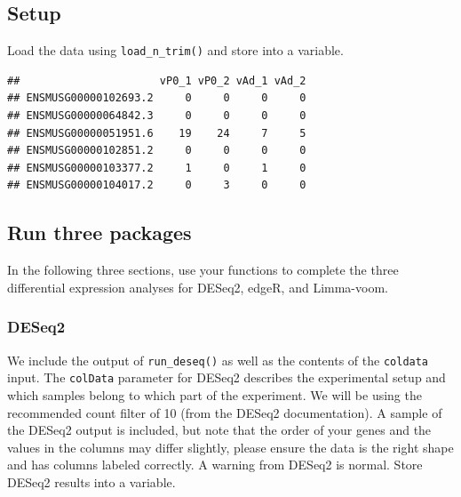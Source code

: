 \documentclass[
]{article}
\newenvironment{Shaded}{\begin{snugshade}}{\end{snugshade}}
\newcommand{\AttributeTok}[1]{\textcolor[rgb]{0.13,0.29,0.53}{#1}}
\newcommand{\CommentTok}[1]{\textcolor[rgb]{0.56,0.35,0.01}{\textit{#1}}}
\newcommand{\ConstantTok}[1]{\textcolor[rgb]{0.56,0.35,0.01}{#1}}
\newcommand{\FunctionTok}[1]{\textcolor[rgb]{0.13,0.29,0.53}{\textbf{#1}}}
\newcommand{\NormalTok}[1]{#1}
\newcommand{\SpecialCharTok}[1]{\textcolor[rgb]{0.81,0.36,0.00}{\textbf{#1}}}
\newcommand{\StringTok}[1]{\textcolor[rgb]{0.31,0.60,0.02}{#1}}
\begin{document}
\subsection{Setup}\label{setup}

\begin{Shaded}
\end{Shaded}

Load the data using \texttt{load\_n\_trim()} and store into a variable.

\begin{verbatim}
##                      vP0_1 vP0_2 vAd_1 vAd_2
## ENSMUSG00000102693.2     0     0     0     0
## ENSMUSG00000064842.3     0     0     0     0
## ENSMUSG00000051951.6    19    24     7     5
## ENSMUSG00000102851.2     0     0     0     0
## ENSMUSG00000103377.2     1     0     1     0
## ENSMUSG00000104017.2     0     3     0     0
\end{verbatim}

\subsection{Run three packages}\label{run-three-packages}

In the following three sections, use your functions to complete the
three differential expression analyses for DESeq2, edgeR, and
Limma-voom.

\subsubsection{DESeq2}\label{deseq2}

We include the output of \texttt{run\_deseq()} as well as the contents
of the \texttt{coldata} input. The \texttt{colData} parameter for DESeq2
describes the experimental setup and which samples belong to which part
of the experiment. We will be using the recommended count filter of 10
(from the DESeq2 documentation). A sample of the DESeq2 output is
included, but note that the order of your genes and the values in the
columns may differ slightly, please ensure the data is the right shape
and has columns labeled correctly. A warning from DESeq2 is normal.
Store DESeq2 results into a variable.
\end{document}
